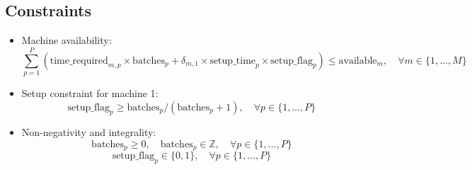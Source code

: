 \documentclass{article}
\begin{document}
\subsection*{Constraints}
\begin{itemize}
    \item Machine availability:
    \[
    \sum_{p=1}^{P} \left( \text{time\_required}_{m,p} \times \text{batches}_{p} + \delta_{m,1} \times \text{setup\_time}_{p} \times \text{setup\_flag}_{p} \right) \leq \text{available}_{m}, \quad \forall m \in \{1, \ldots, M\}
    \]
    
    \item Setup constraint for machine 1:
    \[
    \text{setup\_flag}_{p} \geq \text{batches}_{p}/(\text{batches}_{p} + 1), \quad \forall p \in \{1, \ldots, P\}
    \]
    
    \item Non-negativity and integrality:
    \[
    \text{batches}_{p} \geq 0, \quad \text{batches}_{p} \in \mathbb{Z}, \quad \forall p \in \{1, \ldots, P\}
    \]
    \[
    \text{setup\_flag}_{p} \in \{0, 1\}, \quad \forall p \in \{1, \ldots, P\}
    \]
\end{itemize}
\end{document}
